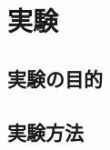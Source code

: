 \chapter{実験}
\label{chap:exeperiment}


\section{実験の目的}
\label{sec:purpose}


\section{実験方法}
\label{sec:method}


